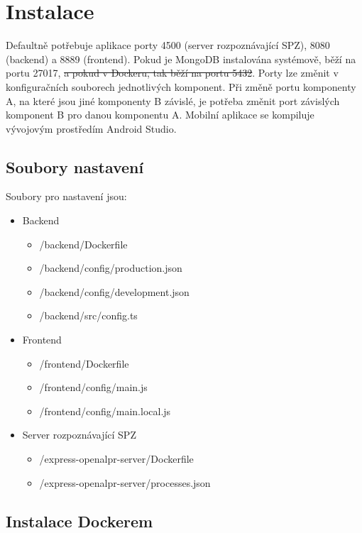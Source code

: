 
\chapter{Instalace}

\noindent
Defaultně potřebuje aplikace porty 4500 (server rozpoznávající SPZ), 8080 (backend) a
8889 (frontend). Pokud je MongoDB instalována systémově, běží na portu 27017,
\sout{a pokud v Dockeru, tak běží na portu 5432}.
Porty lze změnit v konfiguračních souborech jednotlivých
komponent. Při změně portu komponenty A, na které jsou jiné komponenty B závislé,
je potřeba změnit port závislých komponent B pro danou komponentu A.
Mobilní aplikace se kompiluje vývojovým prostředím Android Studio.

\section{Soubory nastavení}

\noindent
Soubory pro nastavení jsou:

\begin{itemize}
  \setlength\itemsep{-.3em}
  \item Backend
  \begin{itemize}
    \item /backend/Dockerfile
    \item /backend/config/production.json
    \item /backend/config/development.json
    \item /backend/src/config.ts
  \end{itemize}
  \item Frontend
  \begin{itemize}
    \item /frontend/Dockerfile
    \item /frontend/config/main.js
    \item /frontend/config/main.local.js
  \end{itemize}
  \item Server rozpoznávající SPZ
  \begin{itemize}
    \item /express-openalpr-server/Dockerfile
    \item /express-openalpr-server/processes.json
  \end{itemize}
\end{itemize}

\newpage
\section{Instalace Dockerem}

